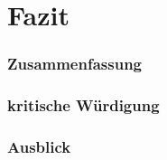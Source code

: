 
\chapter{Fazit}
\todo{}

\subsection{Zusammenfassung}

\subsection{kritische Würdigung}

\subsection{Ausblick}